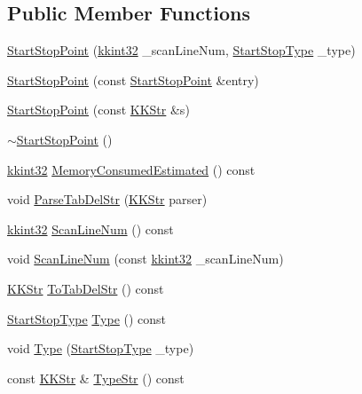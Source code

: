 \subsection*{Public Member Functions}
\begin{DoxyCompactItemize}
\item 
\hyperlink{class_k_k_l_s_c_1_1_start_stop_point_ab8a1eb0071cb77f55bd3a52f5c79db50}{Start\+Stop\+Point} (\hyperlink{namespace_k_k_b_a8fa4952cc84fda1de4bec1fbdd8d5b1b}{kkint32} \+\_\+scan\+Line\+Num, \hyperlink{class_k_k_l_s_c_1_1_start_stop_point_aca5818602fc58bfe4c9794b311288680}{Start\+Stop\+Type} \+\_\+type)
\item 
\hyperlink{class_k_k_l_s_c_1_1_start_stop_point_aabb276e515572656e236fd4d05d0e802}{Start\+Stop\+Point} (const \hyperlink{class_k_k_l_s_c_1_1_start_stop_point}{Start\+Stop\+Point} \&entry)
\item 
\hyperlink{class_k_k_l_s_c_1_1_start_stop_point_aac5adbd502f85c2d77c9c9d4ef0fd4a9}{Start\+Stop\+Point} (const \hyperlink{class_k_k_b_1_1_k_k_str}{K\+K\+Str} \&s)
\item 
\hyperlink{class_k_k_l_s_c_1_1_start_stop_point_abb909162b9b97e1797599994e6d4f033}{$\sim$\+Start\+Stop\+Point} ()
\item 
\hyperlink{namespace_k_k_b_a8fa4952cc84fda1de4bec1fbdd8d5b1b}{kkint32} \hyperlink{class_k_k_l_s_c_1_1_start_stop_point_a089b90ca03f3e17da78ca2802a60ba4d}{Memory\+Consumed\+Estimated} () const 
\item 
void \hyperlink{class_k_k_l_s_c_1_1_start_stop_point_a796c8571c293425ba817fa83f8b95876}{Parse\+Tab\+Del\+Str} (\hyperlink{class_k_k_b_1_1_k_k_str}{K\+K\+Str} parser)
\item 
\hyperlink{namespace_k_k_b_a8fa4952cc84fda1de4bec1fbdd8d5b1b}{kkint32} \hyperlink{class_k_k_l_s_c_1_1_start_stop_point_ab873af5c2db2eee1c9a4da88b839fdb3}{Scan\+Line\+Num} () const 
\item 
void \hyperlink{class_k_k_l_s_c_1_1_start_stop_point_abbe74ff4387fe1893f6c08b44155f8e3}{Scan\+Line\+Num} (const \hyperlink{namespace_k_k_b_a8fa4952cc84fda1de4bec1fbdd8d5b1b}{kkint32} \+\_\+scan\+Line\+Num)
\item 
\hyperlink{class_k_k_b_1_1_k_k_str}{K\+K\+Str} \hyperlink{class_k_k_l_s_c_1_1_start_stop_point_aa47f3edce1a5b72cbdbc323e6cd515be}{To\+Tab\+Del\+Str} () const 
\item 
\hyperlink{class_k_k_l_s_c_1_1_start_stop_point_aca5818602fc58bfe4c9794b311288680}{Start\+Stop\+Type} \hyperlink{class_k_k_l_s_c_1_1_start_stop_point_a0e45baa90bfa244650017316aadc8dc7}{Type} () const 
\item 
void \hyperlink{class_k_k_l_s_c_1_1_start_stop_point_acbaebf387054f8d05f95fa76c8c7d9e7}{Type} (\hyperlink{class_k_k_l_s_c_1_1_start_stop_point_aca5818602fc58bfe4c9794b311288680}{Start\+Stop\+Type} \+\_\+type)
\item 
const \hyperlink{class_k_k_b_1_1_k_k_str}{K\+K\+Str} \& \hyperlink{class_k_k_l_s_c_1_1_start_stop_point_a9a9b660a2df7d91cb72e253574cb2710}{Type\+Str} () const 
\end{DoxyCompactItemize}
